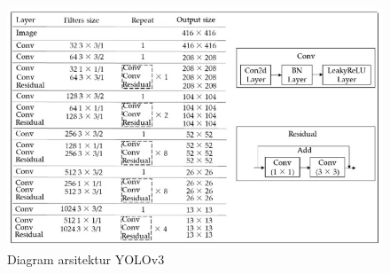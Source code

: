 \begin{figure}[ht]
  \centering
  \includegraphics[scale=0.7]{gambar/diagramarsiyolov3.jpg}
  \caption{Diagram arsitektur YOLOv3}
  \label{fig:diagramyolov3}
\end{figure}

